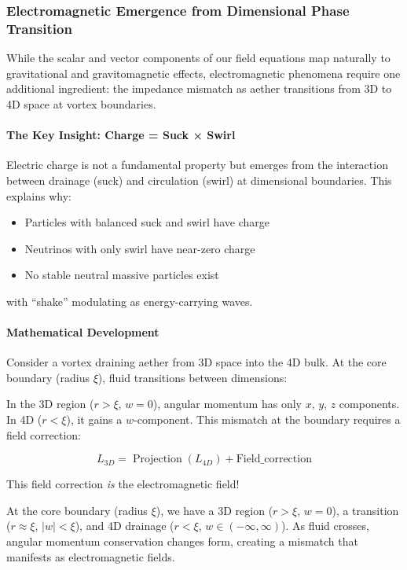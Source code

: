 \subsubsection{Electromagnetic Emergence from Dimensional Phase Transition}

While the scalar and vector components of our field equations map naturally to gravitational and gravitomagnetic effects, electromagnetic phenomena require one additional ingredient: the impedance mismatch as aether transitions from 3D to 4D space at vortex boundaries.

\paragraph{The Key Insight: Charge = Suck × Swirl}

Electric charge is not a fundamental property but emerges from the interaction between drainage (suck) and circulation (swirl) at dimensional boundaries. This explains why:
\begin{itemize}
\item Particles with balanced suck and swirl have charge
\item Neutrinos with only swirl have near-zero charge
\item No stable neutral massive particles exist
\end{itemize}

with ``shake'' modulating as energy-carrying waves.

\paragraph{Mathematical Development}

Consider a vortex draining aether from 3D space into the 4D bulk. At the core boundary (radius $\xi$), fluid transitions between dimensions:

In the 3D region ($r > \xi$, $w = 0$), angular momentum has only $x,\,y,\,z$ components. In 4D ($r < \xi$), it gains a $w$-component. This mismatch at the boundary requires a field correction:

\[
L_{3D} = \operatorname{Projection}(L_{4D}) + \text{Field\_correction}
\]

This field correction \emph{is} the electromagnetic field!

At the core boundary (radius $\xi$), we have a 3D region ($r > \xi$, $w = 0$), a transition ($r \approx \xi$, $|w| < \xi$), and 4D drainage ($r < \xi$, $w \in (-\infty,\infty)$). As fluid crosses, angular momentum conservation changes form, creating a mismatch that manifests as electromagnetic fields.

